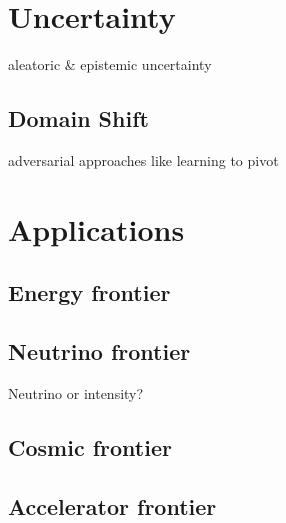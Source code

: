 

\section{Uncertainty}\label{ML:sec:uncert}

aleatoric \& epistemic uncertainty


\subsection{Domain Shift}\label{ML:sec:domain_shift}

adversarial approaches like learning to pivot

\section{Applications}\label{ML:sec:applications}


\subsection{Energy frontier}\label{ML:sec:energy_frontier}

\subsection{Neutrino frontier}\label{ML:sec:intensity_frontier}
Neutrino or intensity? 

\subsection{Cosmic frontier}\label{ML:sec:cosmic_frontier}


\subsection{Accelerator frontier}\label{ML:sec:accelerator_frontier}



